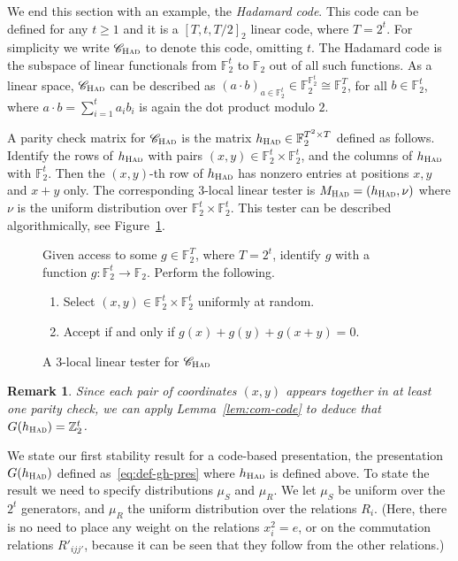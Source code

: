 \documentclass[11pt]{article}
\newtheorem{remark}[theorem]{Remark}
\theoremstyle{definition}
\newcommand{\code}{\mathscr{C}}
\newcommand{\field}{\mathbb{F}_2}
\newcommand{\F}{\ensuremath{\mathbb{F}}}
\newcommand{\Z}{\ensuremath{\mathbb{Z}}}
\newcommand{\had}{\textsc{Had}}
\newenvironment{gamespec}{
  \begin{mdframed}[style=figstyle]}{
  \end{mdframed}}
\begin{document}
We end this section with an example, the \emph{Hadamard code}. This code can be defined for any  $t\geq 1$ and it is a $[T,t,T/2]_2$ linear code, where $T=2^t$. For simplicity we write  $\code_\had$ to denote this code, omitting $t$. The Hadamard code is the subspace of linear functionals from $\field^t$ to $\field$ out of all such functions. As a linear space, $\code_\had$ can be described as  $(a\cdot b)_{a\in \field^t} \in \field^{\field^t}\cong \field^T$, for all $b\in \field^t$, where $ a\cdot b=\sum_{i=1}^t a_ib_i$ is again the dot product modulo $2$. 

A parity check matrix for $\code_\had$ is the matrix $h_\had\in \F_2^{T^2\times T}$ defined as follows. Identify the rows of $h_\had$ with pairs $(x,y)\in \F_2^t\times \F_2^t$, and the columns of $h_\had$ with $\F_2^t$. Then the $(x,y)$-th row of $h_\had$ has nonzero entries at positions $x,y$ and $x+y$ only. 
The corresponding $3$-local linear tester is $M_\had = (h_\had,\nu)$ where $\nu$ is the uniform distribution over $\F_2^t \times \F_2^t$. This tester can be described algorithmically, see Figure~\ref{fig:test-had}. 

\begin{figure}[!htbp]
  \centering
  \begin{gamespec}
	Given access to some $g\in \F_2^T$, where $T=2^t$, identify $g$ with a function $g:\F_2^t\to\F_2$. Perform the following. 
\begin{enumerate}
\item Select $(x,y)\in \F_2^t \times \F_2^t$ uniformly at random. 
\item Accept if and only if $g(x)+g(y)+g(x+y)=0$.  	
    \end{enumerate}
  \end{gamespec}
  \caption{A $3$-local linear tester for $\code_{\had}$}
  \label{fig:test-had}
\end{figure}

\begin{remark}
Since each pair of coordinates $(x,y)$ appears together in at least one parity check, we can apply Lemma~\ref{lem:com-code} to deduce that $G(h_\had)=\Z_2^t$. 
\end{remark}

We state our first stability result for a code-based presentation, the presentation $G(h_\had)$ defined as~\eqref{eq:def-gh-pres} where $h_\had$ is defined above. To state the result we need to specify distributions $\mu_S$ and $\mu_R$. We let $\mu_S$ be uniform over the $2^t$ generators, and $\mu_R$ the uniform distribution over the relations $R_{i}$. (Here, there is no need to place any weight on the relations $x_i^2=e$, or on the commutation relations $R'_{ijj'}$, because it can be seen that they follow from the other relations.)  
\end{document}
